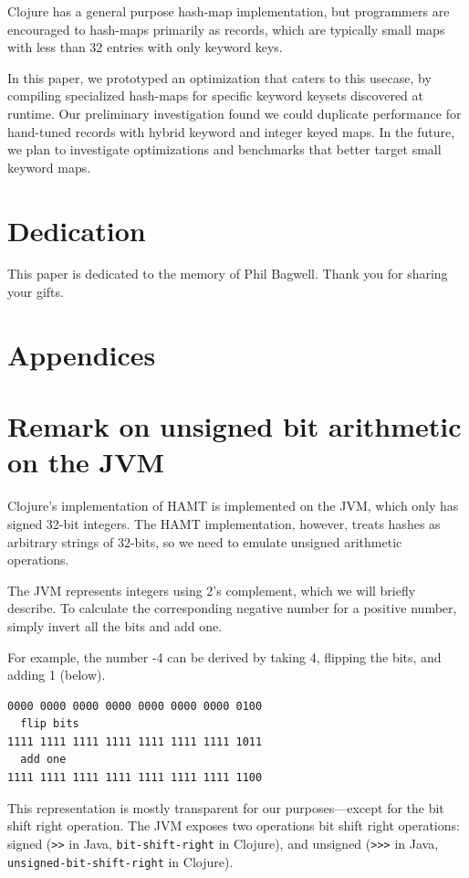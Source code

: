 \documentclass[preprint]{sigplanconf}
\begin{document}
Clojure has a general purpose hash-map implementation, but
programmers are encouraged to hash-maps primarily as records,
which are typically small maps with less than 32 entries
with only keyword keys.

In this paper, we prototyped an optimization that caters
to this usecase, by compiling specialized hash-maps
for specific keyword keysets discovered at runtime.
Our preliminary investigation found we could duplicate
performance for hand-tuned records with hybrid keyword and
integer keyed maps.
In the future, we plan to investigate optimizations
and benchmarks that better target small keyword maps.

\section{Dedication}
This paper is dedicated to the memory of Phil Bagwell.
Thank you for sharing your gifts.

\printbibliography[title=References]

\newpage
\appendix
\section*{Appendices}

\section{Remark on unsigned bit arithmetic on the JVM}
\label{jvm-bit-remark}

Clojure's implementation of HAMT is implemented on the JVM,
which only has signed 32-bit integers.
The HAMT implementation, however, treats hashes as
arbitrary strings of 32-bits, so we need to emulate
unsigned arithmetic operations.

The JVM represents integers using 2's complement,
which we will briefly describe.
To calculate the corresponding negative number for
a positive number, simply invert all the bits and add one.

For example, the number -4 can be derived by taking
4, flipping the bits, and adding 1 (below).

\begin{verbatim}
0000 0000 0000 0000 0000 0000 0000 0100
  flip bits
1111 1111 1111 1111 1111 1111 1111 1011
  add one
1111 1111 1111 1111 1111 1111 1111 1100
\end{verbatim}

This representation is mostly transparent for our
purposes---except for the bit shift right operation.
%
The JVM exposes two operations bit shift right
operations: signed
(\texttt{>>} in Java, \texttt{bit-shift-right} in Clojure),
and unsigned
(\texttt{>>>} in Java, \texttt{unsigned-bit-shift-right} in Clojure).
\end{document}
